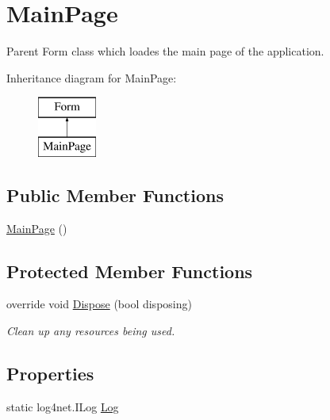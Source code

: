 \hypertarget{classWildlifeTrackingApp_1_1MainPage}{}\section{Main\+Page}
\label{classWildlifeTrackingApp_1_1MainPage}


Parent Form class which loades the main page of the application.  


Inheritance diagram for Main\+Page\+:\begin{figure}[H]
\begin{center}
\leavevmode
\includegraphics[height=2.000000cm]{classWildlifeTrackingApp_1_1MainPage}
\end{center}
\end{figure}
\subsection*{Public Member Functions}
\begin{DoxyCompactItemize}
\item 
\hyperlink{classWildlifeTrackingApp_1_1MainPage_a6fbc6092ff7046d51931408a67b5e855}{Main\+Page} ()
\end{DoxyCompactItemize}
\subsection*{Protected Member Functions}
\begin{DoxyCompactItemize}
\item 
override void \hyperlink{classWildlifeTrackingApp_1_1MainPage_a849c3c7f8d08104f0cdb46bee9fe6389}{Dispose} (bool disposing)
\begin{DoxyCompactList}\small\item\em Clean up any resources being used. \end{DoxyCompactList}\end{DoxyCompactItemize}
\subsection*{Properties}
\begin{DoxyCompactItemize}
\item 
static log4net.\+I\+Log \hyperlink{classWildlifeTrackingApp_1_1MainPage_a5fc9abb86e6110ecd61d0a1a7d740a8a}{Log}
\end{DoxyCompactItemize}
